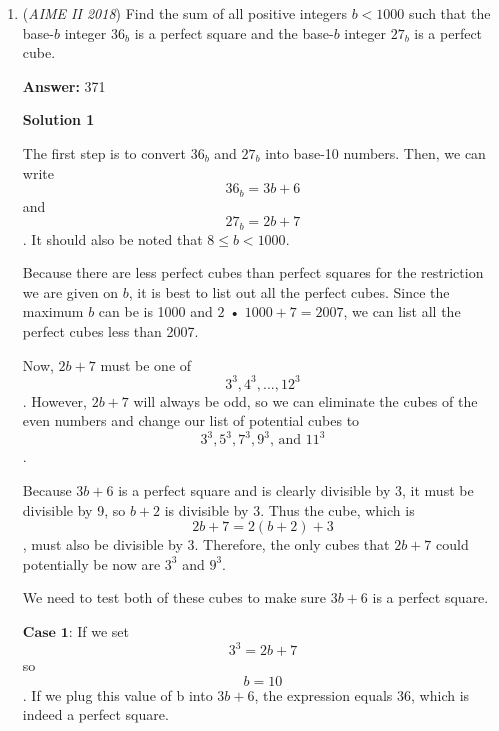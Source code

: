 \begin{enumerate}
 Plugging in $n=0,1,2$ we get

 $(*)$$a+b+c\equiv2,$
$(**)$$a+6b+8c\equiv5,$
$(***)$$a+3b+9c\equiv8$
$\frac{(***)-(*)}{2}$$\implies b+4c\equiv3$ and $(***)-(**)$$\implies -3b+c\equiv3$

 so $a\equiv6,$ $b\equiv1,$ and $c\equiv6$

 Hence, $a_n\equiv 6+(6^n)+6(8^n)\equiv(2)^{-n\pmod{10}}+(2)^{3n-1\pmod{10}}-5\pmod{11}$

 Therefore

 $a_{2018}\equiv4+8-5=7$
$a_{2020}\equiv1+6-5=2$
$a_{2022}\equiv3+10-5=8$

 And the answer is $7\times2\times8=\boxed{112}$



	\item (\textit{AIME II 2018}) Find the sum of all positive integers $b < 1000$ such that the base-$b$ integer $36_{b}$ is a perfect square and the base-$b$ integer $27_{b}$ is a perfect cube.


 
 \textbf{Answer: }371



\textbf{Solution 1}

The first step is to convert $36_{b}$ and $27_{b}$ into base-10 numbers. Then, we can write 
 \[36_{b} = 3b + 6\] and 
 \[27_{b} = 2b + 7\]. It should also be noted that $8 \leq b < 1000$.

 Because there are less perfect cubes than perfect squares for the restriction we are given on $b$, it is best to list out all the perfect cubes. Since the maximum $b$ can be is 1000 and $2$ • $1000 + 7 = 2007$, we can list all the perfect cubes less than 2007.

 Now, $2b + 7$ must be one of 
 \[3^3, 4^3, ... , 12^3\]. However, $2b + 7$ will always be odd, so we can eliminate the cubes of the even numbers and change our list of potential cubes to 
 \[3^3, 5^3, 7^3, 9^3\text{, and }11^3\].

 Because $3b + 6$ is a perfect square and is clearly divisible by 3, it must be divisible by 9, so $b + 2$ is divisible by 3. Thus the cube, which is 
 \[2b + 7 = 2(b + 2) + 3\], must also be divisible by 3. Therefore, the only cubes that $2b + 7$ could potentially be now are $3^3$ and $9^3$.

 We need to test both of these cubes to make sure $3b + 6$ is a perfect square.

 $\textbf{Case 1:}$ If we set 
 \[3^3 = 2b + 7\]so 
 \[b = 10\]. If we plug this value of b into $3b + 6$, the expression equals $36$, which is indeed a perfect square.


\end{enumerate}
